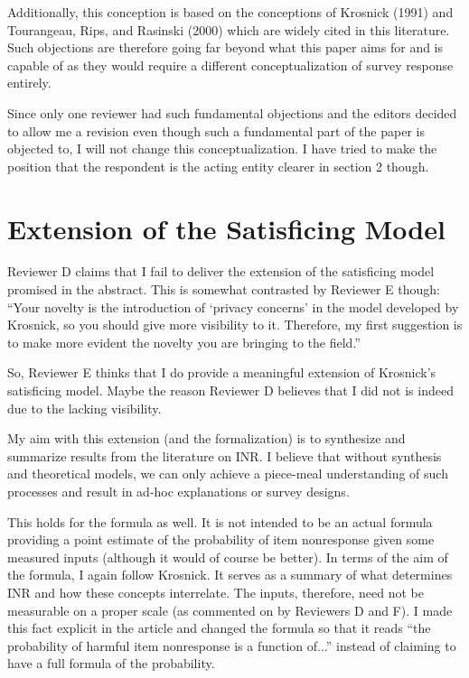 \documentclass[a4paper, 12pt]{article}
\begin{document}
Additionally, this conception is based on the conceptions of Krosnick (1991) and Tourangeau, Rips, and Rasinski (2000) which are widely cited in this literature. Such objections are therefore going far beyond what this paper aims for and is capable of as they would require a different conceptualization of survey response entirely.

Since only one reviewer had such fundamental objections and the editors decided to allow me a revision even though such a fundamental part of the paper is objected to, I will not change this conceptualization. I have tried to make the position that the respondent is the acting entity clearer in section 2 though.


\section{Extension of the Satisficing Model}

Reviewer D claims that I fail to deliver the extension of the satisficing model promised in the abstract. This is somewhat contrasted by Reviewer E though: ``Your novelty is the introduction of ‘privacy concerns’ in the model developed by Krosnick, so you should give more visibility to it. Therefore, my first suggestion is to make more evident the novelty you are bringing to the field.''

So, Reviewer E thinks that I do provide a meaningful extension of Krosnick's satisficing model. Maybe the reason Reviewer D believes that I did not is indeed due to the lacking visibility.

My aim with this extension (and the formalization) is to synthesize and summarize results from the literature on INR. I believe that without synthesis and theoretical models, we can only achieve a piece-meal understanding of such processes and result in ad-hoc explanations or survey designs.

This holds for the formula as well. It is not intended to be an actual formula providing a point estimate of the probability of item nonresponse given some measured inputs (although it would of course be better). In terms of the aim of the formula, I again follow Krosnick. It serves as a summary of what determines INR and how these concepts interrelate. The inputs, therefore, need not be measurable on a proper scale (as commented on by Reviewers D and F). I made this fact explicit in the article and changed the formula so that it reads ``the probability of harmful item nonresponse is a function of...'' instead of claiming to have a full formula of the probability.
\end{document}
